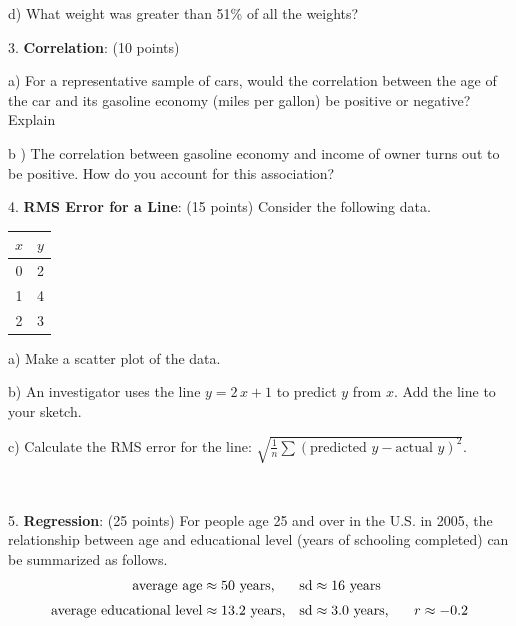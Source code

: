 \documentclass[10pt]{article}
\begin{document}
\hspace{10pt} d) What weight was greater than 51\% of all the weights?
\vfill
\eject
{\ }


3. \textbf{Correlation}: (10 points) 

\hspace{20pt} a) For a representative sample of cars, would the correlation between the
age of the car and its gasoline economy (miles per gallon) be positive or negative?  Explain
\vspace{1.5in}

\hspace{20pt} b ) The correlation between gasoline economy and income of owner turns out to 
be positive.  How do you account for this association?
\vspace{1.5in}

4. \textbf{RMS Error for a Line}: (15 points) Consider the following data.
\begin{tabular}{|c|c|}\hline
$x$ & $y$\\\hline
0   & 2\\
1   & 4\\
2   & 3\\\hline
\end{tabular}

\hspace{10pt} a) Make a scatter plot of the data.  
\vspace{2in}

\hspace{10pt} b) An investigator uses the line $y=2\,x + 1$ to predict $y$ from $x$.
Add the line to your sketch.
\medskip

\hspace{10pt} c) Calculate the RMS error for the line:
$\displaystyle\sqrt{\frac{1}{n}\sum\left(\mbox{predicted $y$} - \mbox{actual $y$}\right)^2}$.

\vfill
\eject
{\ }

5. \textbf{Regression}: 
(25 points) For people age 25 and over in the U.S. in 2005, the relationship between
age and educational level (years of schooling completed) can be summarized as
follows. \vspace{-5pt}
\begin{align*}
\mbox{average age}         & \approx \mbox{50 years,}    & \mbox{sd} & \approx \mbox{16 years}\\[3pt]
\mbox{average educational level}  & \approx \mbox{13.2 years,}  & \mbox{sd} & \approx \mbox{3.0 years,
   \hspace{15pt}} r\approx -0.2
\end{align*}\vspace{-5pt}
\end{document}
